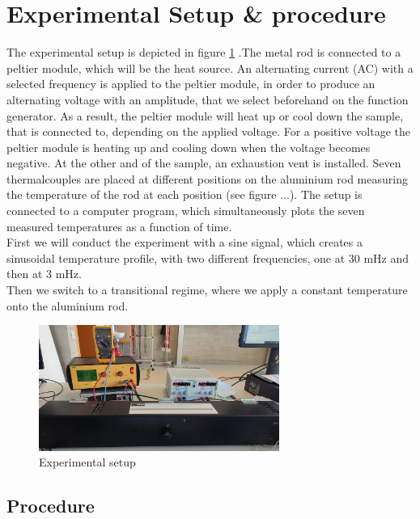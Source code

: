 \documentclass{scrartcl}
\begin{document}
\section{Experimental Setup \& procedure}
The experimental setup is depicted in figure \ref{fig:setup} .The metal rod is connected to a peltier module, which will be the heat source. An alternating current (AC) with a selected frequency is applied to the peltier module, in order to produce an alternating voltage with an amplitude, that we select beforehand on the function generator. As a result, the peltier module will heat up or cool down the sample, that is connected to, depending on the applied voltage. For a positive voltage the peltier module is heating up and cooling down when the voltage becomes negative. At the other and of the sample, an exhaustion vent is installed. Seven thermalcouples are placed at different positions on the aluminium rod measuring the temperature of the rod at each position (see figure ...). The setup is connected to a computer program, which simultaneously plots the seven measured temperatures as a function of time. \\
First we will conduct the experiment with a sine signal, which creates a sinusoidal temperature profile, with two different frequencies, one at 30 mHz and then at 3 mHz. \\
Then we switch to a transitional regime, where we apply a constant temperature onto the aluminium rod. 
\begin{figure}[H]
    \centering
    \includegraphics[width=0.7\textwidth]{Bilder/1652865310453.jpg}
    \caption{Experimental setup}
    \label{fig:setup}
\end{figure}

\subsection{Procedure}
\end{document}
